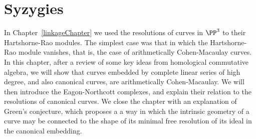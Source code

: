 

\chapter{Syzygies}
\label{SyzygiesChapter}

%
%
%
%
%
\def\length{{\rm length}}

%
%


In Chapter~\ref{linkageChapter} we used the resolutions of curves in $\PP^3$ to their Hartshorne-Rao modules. The
simplest case was that in which the Hartshorne-Rao module vanishes, that is, the case of arithmetically Cohen-Macaulay curves.
In this chapter, after a review of some key ideas from homological commutative algebra, we will show that curves embedded by complete linear series of high degree, and also canonical curves, are arithmetically
Cohen-Macaulay. We will then introduce the Eagon-Northcott complexes, and explain their relation to the resolutions of canonical curves. We close the chapter with an explanation of Green's conjecture, which proposes a a way in which the intrinsic geometry
of a curve may be connected to the shape of its minimal free resolution of its ideal in the canonical embedding.


